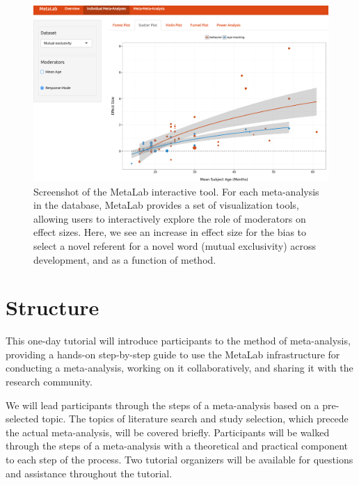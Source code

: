 \documentclass[10pt,letterpaper]{article}
\begin{document}
\begin{figure}[t]
\begin{center}
\includegraphics[scale = .2]{power_calculator2.png}
\end{center}
\vspace{-.5em}
\caption{Screenshot of the MetaLab interactive tool. For each meta-analysis in the database, MetaLab provides a set of visualization tools, allowing users to interactively explore the role of moderators on effect sizes. Here, we see an increase in effect size for the bias to select a novel referent for a novel word (mutual exclusivity) across development, and as a function of method. }
\label{fig:lev}
\vspace{-1em}
\end{figure}

\section{Structure}

This one-day tutorial will introduce participants to the method of meta-analysis, providing a hands-on step-by-step guide to use the MetaLab infrastructure for conducting a meta-analysis, working on it collaboratively, and sharing it with the research community.

We will lead participants through the steps of a meta-analysis based on a pre-selected topic. The topics of literature search and study selection, which precede the actual meta-analysis, will be covered briefly. Participants will be walked through the steps of a meta-analysis with a theoretical and practical component to each step of the process. Two tutorial organizers will be available for questions and assistance throughout the tutorial.%
\end{document}
